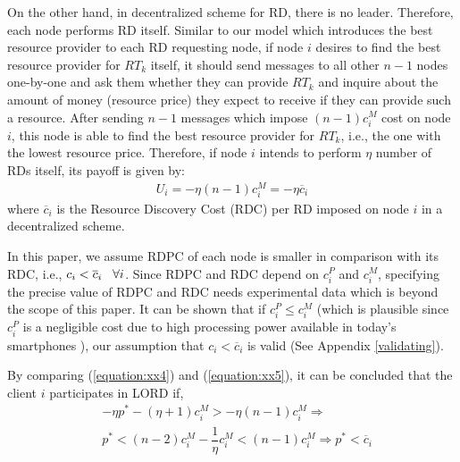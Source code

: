 \documentclass[journal,12pt, onecolumn]{IEEEtran}
\begin{document}
On the other hand, in decentralized scheme for RD, there is no leader. Therefore, each node performs RD itself. Similar to our model which introduces the best resource provider to each RD requesting node, if node $i$ desires to find the best resource provider for $RT_{k}$ itself, it should send messages to all other $n-1$ nodes one-by-one and ask them whether they can provide $RT_{k}$ and inquire about the amount of money (resource price) they expect to receive if they can provide such a resource. After sending $n-1$ messages which impose $(n-1)c_i ^{M}$ cost on node $i$, this node is able to find the best resource provider for $RT_{k}$, i.e., the one with the lowest resource price. Therefore, if node $i$ intends to perform $\eta$ number of RDs itself, its payoff is given by: 
\begin{align}
\label{equation:xx5}
U_i = -\eta (n-1)c_i ^{M} =  -\eta \overline{c}_i
\end{align}
where $\overline{c}_i$ is the Resource Discovery Cost (RDC) per RD imposed on node $i$ in a decentralized scheme.

In this paper, we assume RDPC of each node is smaller in comparison with its RDC, i.e., $c_i < \overline{c}_i \hspace{3mm} \forall i$. Since RDPC and RDC depend on $c_i ^{P}$ and $c_i ^{M}$, specifying the precise value of RDPC and RDC needs experimental data which is beyond the scope of this paper. It can be shown that if $c_i ^{P} \leq c_i ^{M}$ (which is plausible since $c_i ^{P}$ is a negligible cost due to high processing power available in today's smartphones \cite{x29}), our assumption that $c_i < \overline{c}_i$ is valid (See Appendix \ref{validating}).

By comparing (\ref{equation:xx4}) and (\ref{equation:xx5}), it can be concluded that the client $i$ participates in LORD if, 
\begin{align}
\label{equation:xx668}
&-\eta p^* -(\eta +1) c_i ^{M} > -\eta (n-1)c_i ^{M} \Longrightarrow
\nonumber \\
&  p^* < (n-2)c_i ^{M} - \dfrac{1}{\eta} c_i ^{M} < (n-1)c_i ^{M} \Longrightarrow p^* < \overline{c}_i
\end{align} 
\end{document}
